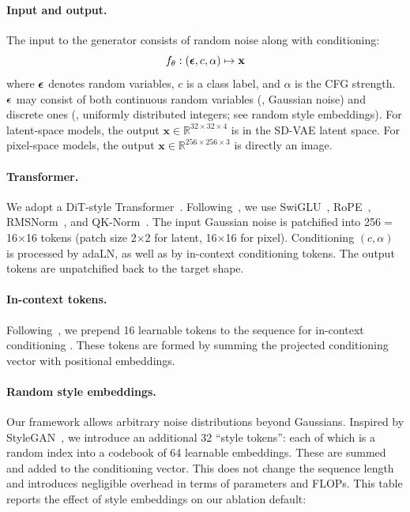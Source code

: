 \paragraph{Input and output.}
The input to the generator consists of random noise along with conditioning:
\[
f_\theta: ({\boldsymbol{\epsilon}}, c, \alpha) \mapsto \mathbf{x}
\]
where ${\boldsymbol{\epsilon}}$ denotes random variables, $c$ is a class label, and $\alpha$ is the CFG strength.
${\boldsymbol{\epsilon}}$ may consist of both continuous random variables (\eg, Gaussian noise) and discrete ones (\eg, uniformly distributed integers; see random style embeddings).
For latent-space models, the output $\mathbf{x} \in \mathbb{R}^{32\times 32\times 4}$ is in the SD-VAE latent space.
For pixel-space models, the output $\mathbf{x} \in \mathbb{R}^{256\times 256\times 3}$ is directly an image.

\paragraph{Transformer.}
We adopt a DiT-style Transformer~\citep{peebles2023scalable}. Following~\citep{yao2025reconstruction}, we use SwiGLU~\citep{shazeer2020glu}, RoPE~\citep{su2024roformer}, RMSNorm~\citep{zhang2019root}, and QK-Norm~\citep{henry2020query}.
The input Gaussian noise is patchified into 256$=$16$\times$16 tokens (patch size 2$\times$2 for latent, 16$\times$16 for pixel).
Conditioning $(c, \alpha)$ is processed by adaLN, as well as by in-context conditioning tokens.
The output tokens are unpatchified back to the target shape.

\paragraph{In-context tokens.}
Following~\cite{li2025back}, we prepend 16 learnable tokens to the sequence for in-context conditioning \cite{peebles2023scalable}.
These tokens are formed by summing the projected conditioning vector with positional embeddings.
\paragraph{Random style embeddings.}
Our framework allows arbitrary noise distributions beyond Gaussians.
Inspired by StyleGAN~\cite{sauer2022stylegan}, we introduce an additional 32 ``style tokens'': each of which is a random index into a codebook of 64 learnable embeddings.
These are summed and added to the conditioning vector.
This does not change the sequence length and introduces negligible overhead in terms of parameters and FLOPs. This table reports the effect of style embeddings on our ablation default:

